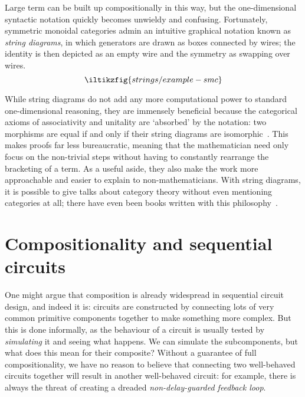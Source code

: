 Large term can be built up compositionally in this way, but the one-dimensional
syntactic notation quickly becomes unwieldy and confusing.
Fortunately, symmetric monoidal categories admin an intuitive graphical notation
known as \emph{string diagrams}, in which generators are drawn as boxes connected
by wires; the identity is then depicted as an empty wire and the symmetry as
swapping over wires.
\[
    \iltikzfig{strings/example-smc}
\]

While string diagrams do not add any more computational power to
standard one-dimensional reasoning, they are
immensely beneficial because the categorical axioms of associativity and
unitality are `absorbed' by the notation: two morphisms are equal if and only if
their string diagrams are isomorphic~\cite{kelly1980coherence,kissinger2014abstract}.
This makes proofs far less bureaucratic, meaning that the mathematician need
only focus on the non-trivial steps without having to constantly rearrange the
bracketing of a term.
As a useful aside, they also make the work more approachable and easier to
explain to non-mathematicians.
With string diagrams, it is possible to give talks about category theory without
even mentioning categories at all; there have even been books written with this
philosophy~\cite{coecke2018picturing}.

\section{Compositionality and sequential circuits}

One might argue that composition is already widespread in sequential circuit
design, and indeed it is: circuits are constructed by connecting lots of very
common primitive components together to make something more complex.
But this is done informally, as the behaviour of a circuit is usually tested
by \emph{simulating} it and seeing what happens.
We can simulate the subcomponents, but what does this mean for their composite?
Without a guarantee of full compositionality, we have no reason to
believe that connecting two well-behaved circuits together will result in
another well-behaved circuit: for example, there is always the threat of
creating a dreaded \emph{non-delay-guarded feedback loop}.


